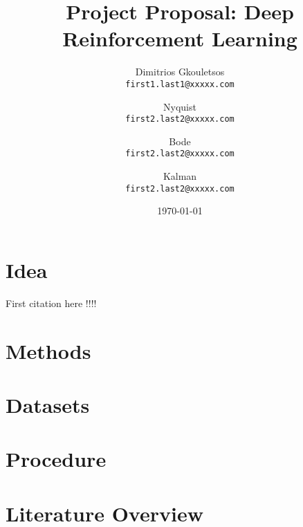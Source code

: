 \documentclass[12pt,oneside]{article}
\title{\Huge\textbf{Project Proposal: Deep Reinforcement Learning}}
\author{
  Dimitrios Gkouletsos\\
  \texttt{first1.last1@xxxxx.com}
  \and
  Nyquist\\
  \texttt{first2.last2@xxxxx.com}
  \and
  Bode\\
  \texttt{first2.last2@xxxxx.com}
  \and
  Kalman\\
  \texttt{first2.last2@xxxxx.com}
}
\date{\today}
\begin{document}
\maketitle

\section{Idea}
	First citation here \cite{sutton} !!!!
	
\section{Methods}

\section{Datasets}
	
\section{Procedure}

\section{Literature Overview}


\end{document}

